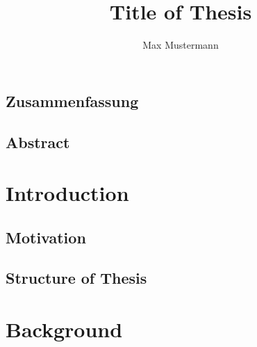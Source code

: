 \documentclass[english,algorithms,reviews,examples,PhD]{amsthesis}
\title{Title of Thesis}
\author{Max Mustermann}
\begin{document}
    \maketitle


    \frontmatter

    \setcounter{tocdepth}{2}
    \tableofcontents
    
    \begin{otherlanguage}{ngerman} %
    \chapter{Zusammenfassung}    
    \lipsum[1-5]  
    \end{otherlanguage}  

    \begin{otherlanguage}{english} %
    \chapter{Abstract}
    \lipsum[5-9]  
    \end{otherlanguage}

    \listoffigures
  

    

    \mainmatter
  
    \chapter{Introduction}
    \lipsum[1]
    \section{Motivation}
        \lipsum[1-7]
    \section{Structure of Thesis}
        \lipsum[1-7]        

    \chapter{Background}
        \lipsum[1-2]
        \cite{Automatica17_Noack,Fusion23_Funk,ACC11_Noack,ACC18_Rosenthal}
\end{document}
